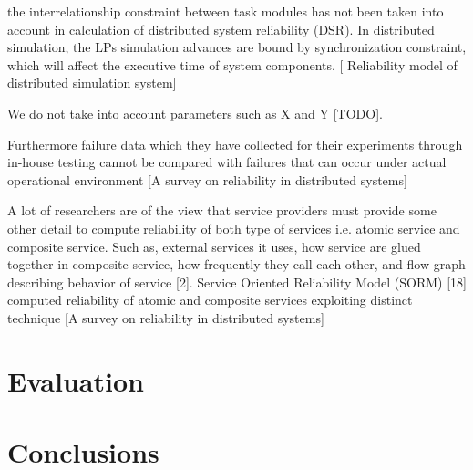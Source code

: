 \documentclass{cslthse-msc}
\begin{document}
the interrelationship constraint between task modules has not been taken into account in calculation of distributed system reliability (DSR). In distributed simulation, the LPs simulation advances are bound by synchronization constraint, which will affect the executive time of system components. [ Reliability model of distributed simulation system]

We do not take into account parameters such as X and Y [TODO].

Furthermore failure data which they have collected for their experiments through in-house testing cannot be compared with failures that can occur under actual operational environment [A survey on reliability in distributed systems]

A lot of researchers are of the view that service providers must provide some other detail to compute reliability of both type of services i.e. atomic service and composite service. Such as, external services it uses, how service are glued together in composite service, how frequently they call each other, and flow graph describing behavior of service [2]. Service Oriented Reliability Model (SORM) [18] computed reliability of atomic and composite services exploiting distinct technique [A survey on reliability in distributed systems]


\chapter{Evaluation} \label{ch:evaluation}

\chapter{Conclusions} \label{ch:conclusions}
\end{document}
